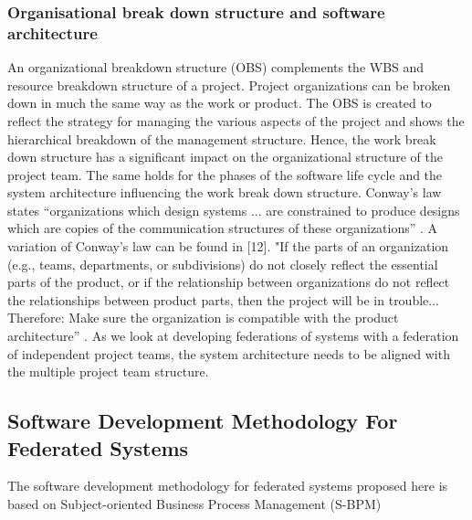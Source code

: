 \subsubsection{Organisational break down structure and software architecture}
An organizational breakdown structure (OBS) complements the WBS and resource breakdown structure of a project. Project organizations can be broken down in much the same way as the work or product. The OBS is created to reflect the strategy for managing the various aspects of the project and shows the hierarchical breakdown of the management structure. Hence, the work break down structure has a significant impact on the organizational structure of the project team. The same holds for the phases of the software life cycle and the system architecture influencing the work break down structure. Conway’s law states “organizations which design systems ... are constrained to produce designs which are copies of the communication structures of these organizations” \cite{article:ConwaysLaw}. A variation of Conway’s law can be found in [12]. "If the parts of an organization (e.g., teams, departments, or subdivisions) do not closely reflect the essential parts of the product, or if the relationship between organizations do not reflect the relationships between product parts, then the project will be in trouble... Therefore: Make sure the organization is compatible with the product architecture” \cite{book:OrgPatternsAgile}.
As we look at developing federations of systems with a federation of independent project teams, the system architecture needs to be aligned with the multiple project team structure.
\\

\subsection{Software Development Methodology For Federated Systems}
The software development methodology for federated systems proposed here is based on Subject-oriented Business Process Management (S-BPM)


